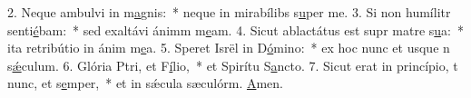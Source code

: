 2. Neque ambulvi in m\uline{a}gnis:~* neque in mirabílibs s\uline{u}per me.
3. Si non humílitr senti\uline{é}bam:~* sed exaltávi ánimm m\uline{e}am.
4. Sicut ablactátus est supr matre s\uline{u}a:~* ita retribútio in ánim m\uline{e}a.
5. Speret Isrël in D\uline{ó}mino:~* ex hoc nunc et usque n s\uline{ǽ}culum.
6. Glória Ptri, et F\uline{í}lio,~* et Spirítu S\uline{a}ncto.
7. Sicut erat in princípio, t nunc, et s\uline{e}mper,~* et in sǽcula sæculórm. \uline{A}men.
